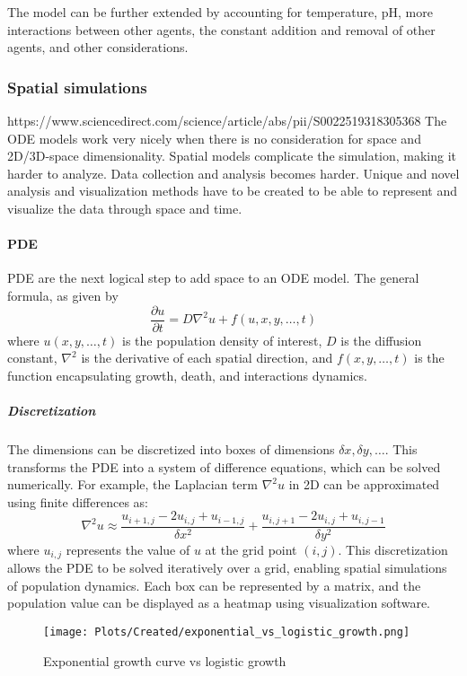 The model can be further extended by accounting for temperature, pH, more interactions between other agents, the constant addition and removal of other agents, and other considerations. 

\subsubsection{Spatial simulations}
https://www.sciencedirect.com/science/article/abs/pii/S0022519318305368
The ODE models work very nicely when there is no consideration for space and 2D/3D-space dimensionality. 
Spatial models complicate the simulation, making it harder to analyze. 
Data collection and analysis becomes harder. 
Unique and novel analysis and visualization methods have to be created to be able to represent and visualize the data through space and time. 
\paragraph{PDE}
PDE are the next logical step to add space to an ODE model. The general formula, as given by 
\[
    \frac{\partial u}{\partial t} = D\nabla^2u + f(u, x, y, \dots, t)
\] where $u(x, y, \dots, t)$ is the population density of interest, $D$ is the diffusion constant, $\nabla^2$ is the derivative of each spatial direction, and $f(x, y, \dots, t)$ is the function encapsulating growth, death, and interactions dynamics. 
\subparagraph{Discretization}
The dimensions can be discretized into boxes of dimensions $\delta x, \delta y, \dots$. 
This transforms the PDE into a system of difference equations, which can be solved numerically. 
For example, the Laplacian term $\nabla^2 u$ in 2D can be approximated using finite differences as:
\[
    \nabla^2 u \approx \frac{u_{i+1,j} - 2u_{i,j} + u_{i-1,j}}{\delta x^2} + \frac{u_{i,j+1} - 2u_{i,j} + u_{i,j-1}}{\delta y^2}
\]
where $u_{i,j}$ represents the value of $u$ at the grid point $(i, j)$. 
This discretization allows the PDE to be solved iteratively over a grid, enabling spatial simulations of population dynamics. 
Each box can be represented by a matrix, and the population value can be displayed as a heatmap using visualization software. 


\begin{figure}
    \centering
    \texttt{[image: Plots/Created/exponential\_vs\_logistic\_growth.png]}
    \caption{Exponential growth curve vs logistic growth}
    \label{fig:created:exponential_vs_logistic_growth}
\end{figure}